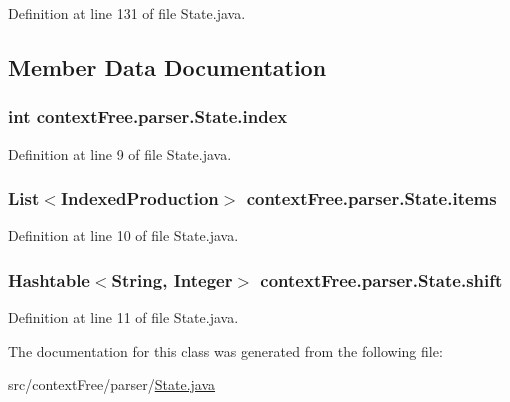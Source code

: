 Definition at line 131 of file State.\-java.



\subsection{Member Data Documentation}
\hypertarget{classcontext_free_1_1parser_1_1_state_ade54fdccdfdced9a3b03c886dbd4bf9e}{
\subsubsection[{index}]{\setlength{\rightskip}{0pt plus 5cm}int {\bf context\-Free.\-parser.\-State.\-index}}}\label{classcontext_free_1_1parser_1_1_state_ade54fdccdfdced9a3b03c886dbd4bf9e}


Definition at line 9 of file State.\-java.

\hypertarget{classcontext_free_1_1parser_1_1_state_ac62b4e843a6a61d6166f1aae98171854}{
\subsubsection[{items}]{\setlength{\rightskip}{0pt plus 5cm}List$<${\bf Indexed\-Production}$>$ {\bf context\-Free.\-parser.\-State.\-items}}}\label{classcontext_free_1_1parser_1_1_state_ac62b4e843a6a61d6166f1aae98171854}


Definition at line 10 of file State.\-java.

\hypertarget{classcontext_free_1_1parser_1_1_state_a7448df2a60c1a493b1305d6d46ceecc6}{
\subsubsection[{shift}]{\setlength{\rightskip}{0pt plus 5cm}Hashtable$<$String, Integer$>$ {\bf context\-Free.\-parser.\-State.\-shift}}}\label{classcontext_free_1_1parser_1_1_state_a7448df2a60c1a493b1305d6d46ceecc6}


Definition at line 11 of file State.\-java.



The documentation for this class was generated from the following file\-:\begin{DoxyCompactItemize}
\item 
src/context\-Free/parser/\hyperlink{_state_8java}{State.\-java}\end{DoxyCompactItemize}
